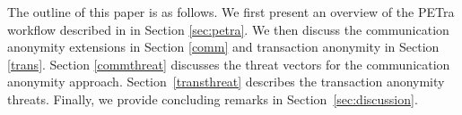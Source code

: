 
The outline of this paper is as follows. We first present an overview of the PETra workflow described in \cite{Laszka17} in Section \ref{sec:petra}. We then discuss the communication anonymity extensions in Section \ref{comm} and transaction anonymity in Section \ref{trans}. Section \ref{commthreat} discusses the threat vectors for the communication anonymity approach. Section~\ref{transthreat} describes the transaction anonymity threats.
Finally, we provide concluding remarks in Section~\ref{sec:discussion}.